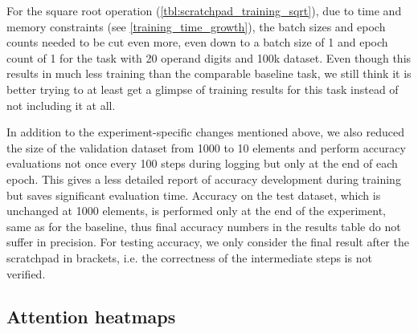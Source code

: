For the square root operation (\cref{tbl:scratchpad_training_sqrt}), due to time and memory constraints (see \cref{training_time_growth}), the batch sizes and epoch counts needed to be cut even more, even down to a batch size of 1 and epoch count of 1 for the task with 20 operand digits and 100k dataset. Even though this results in much less training than the comparable baseline task, we still think it is better trying to at least get a glimpse of training results for this task instead of not including it at all.


In addition to the experiment-specific changes mentioned above, we also reduced the size of the validation dataset from 1000 to 10 elements and perform accuracy evaluations not once every 100 steps during logging but only at the end of each epoch. This gives a less detailed report of accuracy development during training but saves significant evaluation time. Accuracy on the test dataset, which is unchanged at 1000 elements, is performed only at the end of the experiment, same as for the baseline, thus final accuracy numbers in the results table do not suffer in precision.
For testing accuracy, we only consider the final result after the scratchpad in brackets, i.e. the correctness of the intermediate steps is not verified.



\subsection{Attention heatmaps}